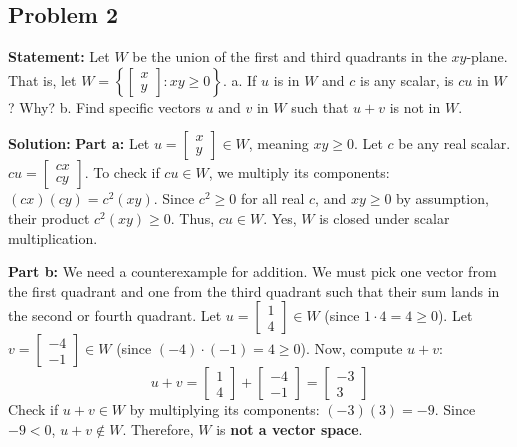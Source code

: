 \documentclass[12pt]{article}
\begin{document}
\subsection{Problem 2}
\textbf{Statement:} Let $W$ be the union of the first and third quadrants in the $xy$-plane. That is, let $W = \left\{ \begin{bmatrix} x \\ y \end{bmatrix} : xy \ge 0 \right\}$. 
a. If $u$ is in $W$ and $c$ is any scalar, is $cu$ in $W$? Why?
b. Find specific vectors $u$ and $v$ in $W$ such that $u+v$ is not in $W$.

\textbf{Solution:}
\textbf{Part a:} Let $u = \begin{bmatrix} x \\ y \end{bmatrix} \in W$, meaning $xy \ge 0$. Let $c$ be any real scalar.
$cu = \begin{bmatrix} cx \\ cy \end{bmatrix}$.
To check if $cu \in W$, we multiply its components: $(cx)(cy) = c^2(xy)$.
Since $c^2 \ge 0$ for all real $c$, and $xy \ge 0$ by assumption, their product $c^2(xy) \ge 0$. 
Thus, $cu \in W$. Yes, $W$ is closed under scalar multiplication.

\textbf{Part b:} We need a counterexample for addition. We must pick one vector from the first quadrant and one from the third quadrant such that their sum lands in the second or fourth quadrant.
Let $u = \begin{bmatrix} 1 \\ 4 \end{bmatrix} \in W$ (since $1 \cdot 4 = 4 \ge 0$).
Let $v = \begin{bmatrix} -4 \\ -1 \end{bmatrix} \in W$ (since $(-4) \cdot (-1) = 4 \ge 0$).
Now, compute $u + v$:
\[ u + v = \begin{bmatrix} 1 \\ 4 \end{bmatrix} + \begin{bmatrix} -4 \\ -1 \end{bmatrix} = \begin{bmatrix} -3 \\ 3 \end{bmatrix} \]
Check if $u+v \in W$ by multiplying its components: $(-3)(3) = -9$.
Since $-9 < 0$, $u+v \notin W$. Therefore, $W$ is \textbf{not a vector space}.
\end{document}
